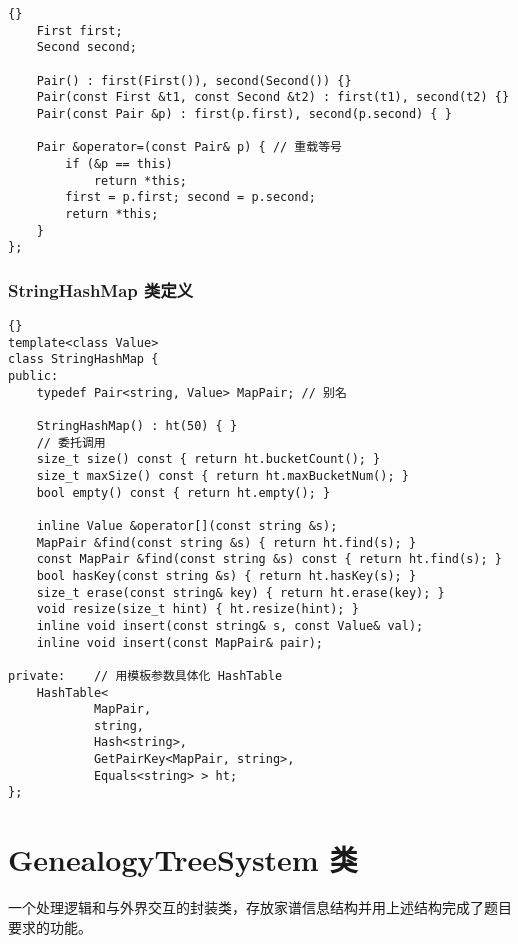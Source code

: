 {\begin{lstlisting}[firstnumber=817, caption=Pair 类定义]{}
    First first;
    Second second;

    Pair() : first(First()), second(Second()) {}
    Pair(const First &t1, const Second &t2) : first(t1), second(t2) {}
    Pair(const Pair &p) : first(p.first), second(p.second) { }

    Pair &operator=(const Pair& p) { // 重载等号
        if (&p == this)
            return *this;
        first = p.first; second = p.second;
        return *this;
    }
};
\end{lstlisting}

\subsection{StringHashMap 类定义}
\begin{lstlisting}[firstnumber=853, caption=StringHashMap 类定义]{}
template<class Value>
class StringHashMap {
public:
    typedef Pair<string, Value> MapPair; // 别名

    StringHashMap() : ht(50) { }
    // 委托调用
    size_t size() const { return ht.bucketCount(); }
    size_t maxSize() const { return ht.maxBucketNum(); }
    bool empty() const { return ht.empty(); }
    
    inline Value &operator[](const string &s);
    MapPair &find(const string &s) { return ht.find(s); }
    const MapPair &find(const string &s) const { return ht.find(s); }
    bool hasKey(const string &s) { return ht.hasKey(s); }
    size_t erase(const string& key) { return ht.erase(key); }
    void resize(size_t hint) { ht.resize(hint); }
    inline void insert(const string& s, const Value& val);
    inline void insert(const MapPair& pair);

private:    // 用模板参数具体化 HashTable
    HashTable<
            MapPair,
            string,
            Hash<string>,
            GetPairKey<MapPair, string>,
            Equals<string> > ht;
};
\end{lstlisting}

}


\chapter{GenealogyTreeSystem 类}

一个处理逻辑和与外界交互的封装类，存放家谱信息结构并用上述结构完成了题目要求的功能。

